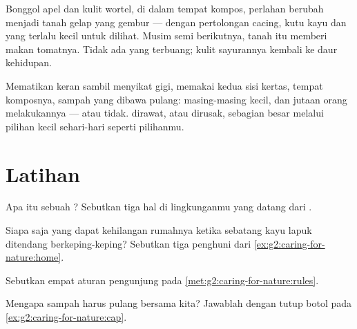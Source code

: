 \begin{example}\label{ex:g2:caring-for-nature:compost}
Bonggol apel dan kulit wortel, di dalam tempat kompos, perlahan
berubah menjadi tanah gelap yang gembur --- dengan pertolongan cacing,
kutu kayu dan  yang terlalu kecil untuk dilihat. Musim
semi berikutnya, tanah itu memberi makan tomatnya. Tidak ada yang
terbuang; kulit sayurannya kembali ke daur kehidupan.
\end{example}

\begin{remark}\label{rem:g2:caring-for-nature:count}
Mematikan keran sambil menyikat gigi, memakai kedua sisi kertas,
tempat komposnya, sampah yang dibawa pulang: masing-masing kecil, dan
jutaan orang melakukannya --- atau tidak.  dirawat, atau dirusak,
sebagian besar melalui pilihan kecil sehari-hari seperti pilihanmu.
\end{remark}

\section{Latihan}

\begin{exercise}[$\star$]\label{exo:g2:caring-for-nature:1}
Apa itu  sebuah ? Sebutkan tiga hal di
lingkunganmu yang datang dari .
\end{exercise}

\begin{exercise}[$\star$]\label{exo:g2:caring-for-nature:2}
Siapa saja yang dapat kehilangan rumahnya ketika sebatang kayu lapuk
ditendang berkeping-keping? Sebutkan tiga penghuni dari
\cref{ex:g2:caring-for-nature:home}.
\end{exercise}

\begin{exercise}[$\star$]\label{exo:g2:caring-for-nature:3}
Sebutkan empat aturan pengunjung pada \cref{met:g2:caring-for-nature:rules}.
\end{exercise}

\begin{exercise}[$\star$]\label{exo:g2:caring-for-nature:4}
Mengapa sampah harus pulang bersama kita? Jawablah dengan tutup botol
pada \cref{ex:g2:caring-for-nature:cap}.
\end{exercise}

